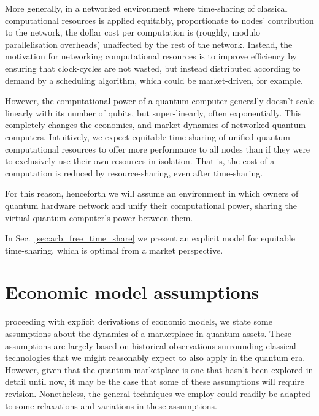More generally, in a networked environment where time-sharing of classical computational resources is applied equitably, proportionate to nodes' contribution to the network, the dollar cost per computation is (roughly, modulo parallelisation overheads) unaffected by the rest of the network. Instead, the motivation for networking computational resources is to improve efficiency by ensuring that clock-cycles are not wasted, but instead distributed according to demand by a scheduling algorithm, which could be market-driven, for example.

However, the computational power of a quantum computer generally doesn't scale linearly with its number of qubits, but super-linearly, often exponentially. This completely changes the economics, and market dynamics of networked quantum computers. Intuitively, we expect equitable time-sharing of unified quantum computational resources to offer more performance to all nodes than if they were to exclusively use their own resources in isolation. That is, the cost of a computation is reduced by resource-sharing, even after time-sharing.

For this reason, henceforth we will assume an environment in which owners of quantum hardware network and unify their computational power, sharing the virtual quantum computer's power between them.

In Sec.~\ref{sec:arb_free_time_share} we present an explicit model for equitable time-sharing, which is optimal from a market perspective.

%
%

\section{Economic model assumptions}

 proceeding with explicit derivations of economic models, we state some assumptions about the dynamics of a marketplace in quantum assets. These assumptions are largely based on historical observations surrounding classical technologies that we might reasonably expect to also apply in the quantum era. However, given that the quantum marketplace is one that hasn't been explored in detail until now, it may be the case that some of these assumptions will require revision. Nonetheless, the general techniques we employ could readily be adapted to some relaxations and variations in these assumptions.

%
%

